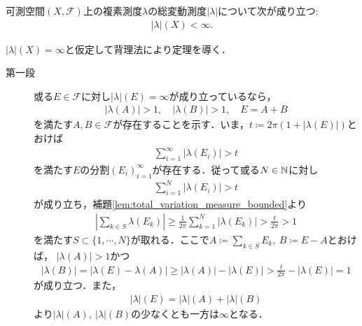 	\begin{screen}
		\begin{thm}[複素測度の有界性]\label{thm:total_variation_measure_bounded}
			可測空間$(X,\mathscr{F})$上の複素測度$\lambda$の総変動測度$|\lambda|$について次が成り立つ:
			\begin{align}
				|\lambda|(X) < \infty.
			\end{align}
		\end{thm}
	\end{screen}

	\begin{prf} $|\lambda|(X) = \infty$と仮定して背理法により定理を導く．
		\begin{description}
		\item[第一段]
			或る$E \in \mathscr{F}$に対し$|\lambda|(E) = \infty$が成り立っているなら，
			\begin{align}
				|\lambda(A)| > 1, \quad |\lambda(B)| > 1, \quad E = A + B
			\end{align}
			を満たす$A,B \in \mathscr{F}$が存在することを示す．いま，$t \coloneqq 2\pi(1 + |\lambda(E)|)$とおけば
			\begin{align}
				\sum_{i=1}^{\infty} |\lambda(E_i)| > t
			\end{align}
			を満たす$E$の分割$(E_i)_{i=1}^{\infty}$が存在する．従って或る$N \in \mathbb{N}$に対し
			\begin{align}
				\sum_{i=1}^{N} |\lambda(E_i)| > t
			\end{align}
			が成り立ち，補題\ref{lem:total_variation_measure_bounded}より
			\begin{align}
				\left| \sum_{k \in S} \lambda(E_k) \right| \geq \frac{1}{2\pi} \sum_{k=1}^{N} |\lambda(E_k)| > \frac{t}{2\pi} > 1
			\end{align}
			を満たす$S \subset \{1,\cdots,N\}$が取れる．ここで$A \coloneqq \sum_{k \in S} E_k,\ B \coloneqq E - A$とおけば，
			$|\lambda(A)| > 1$かつ
			\begin{align}
				|\lambda(B)| = |\lambda(E)-\lambda(A)| \geq |\lambda(A)| - |\lambda(E)| > \frac{t}{2\pi} - |\lambda(E)| = 1
			\end{align}
			が成り立つ．また，
			\begin{align}
				|\lambda|(E) = |\lambda|(A) + |\lambda|(B)
			\end{align}
			より$|\lambda|(A),\ |\lambda|(B)$の少なくとも一方は$\infty$となる．
		

\end{description}
\end{prf}
